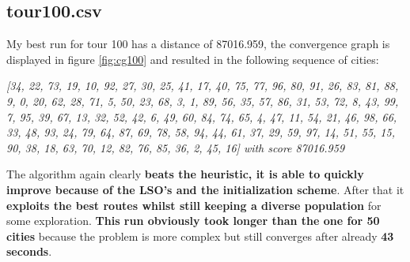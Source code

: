 \documentclass[a4paper,10pt]{article}
\begin{document}
\subsection{tour100.csv}
My best run for tour 100 has a distance of 87016.959, the convergence graph is displayed in figure \ref{fig:cg100} and resulted in the following sequence of cities:
\begin{center}
\small
\textit{[34, 22, 73, 19, 10, 92, 27, 30, 25, 41, 17, 40, 75, 77, 96, 80, 91, 26, 83, 81, 88, 9, 0, 20, 62, 28, 71, 5, 50, 23, 68, 3, 1, 89, 56, 35, 57, 86, 31, 53, 72, 8, 43, 99, 7, 95, 39, 67, 13, 32, 52, 42, 6, 49, 60, 84, 74, 65, 4, 47, 11, 54, 21, 46, 98, 66, 33, 48, 93, 24, 79, 64, 87, 69, 78, 58, 94, 44, 61, 37, 29, 59, 97, 14, 51, 55, 15, 90, 38, 18, 63, 70, 12, 82, 76, 85, 36, 2, 45, 16] with score 87016.959}
\end{center}
The algorithm again clearly \textbf{beats the heuristic, it is able to quickly improve because of the LSO's and the initialization scheme}. After that it \textbf{exploits the best routes whilst still keeping a diverse population} for some exploration. \textbf{This run obviously took longer than the one for 50 cities} because the problem is more complex but still converges after already \textbf{43 seconds}.
\end{document}
